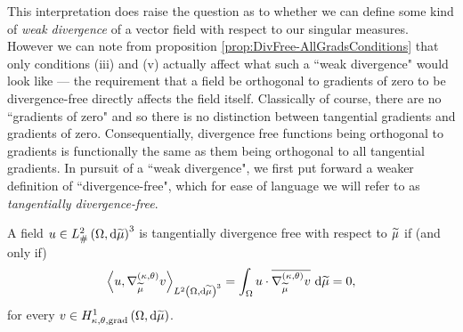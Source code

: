 This interpretation does raise the question as to whether we can define some kind of \emph{weak divergence} of a vector field with respect to our singular measures.
However we can note from proposition \ref{prop:DivFree-AllGradsConditions} that only conditions (iii) and (v) actually affect what such a ``weak divergence" would look like --- the requirement that a field be orthogonal to gradients of zero to be divergence-free directly affects the field itself.
Classically of course, there are no ``gradients of zero" and so there is no distinction between tangential gradients and gradients of zero.
Consequentially, divergence free functions being orthogonal to gradients is functionally the same as them being orthogonal to all tangential gradients.
In pursuit of a ``weak divergence", we first put forward a weaker definition of ``divergence-free", which for ease of language we will refer to as \emph{tangentially divergence-free}.
\begin{definition} \label{def:DivFree-TangGradients}
	A field $u\in L^2_{\#}\left( \Omega,\mathrm{d} \widetilde{\mu} \right)^3$ is tangentially divergence free with respect to $\widetilde{\mu}$ if (and only if)
	\begin{align*}
		\left\langle u , \nabla^{\left( \kappa, \theta \right)}_{\widetilde{\mu}}v \right\rangle_{L^{2}\left( \Omega,\mathrm{d} \widetilde{\mu} \right)^3} = \int_{\Omega} u\cdot\overline{\nabla^{\left( \kappa, \theta \right)}_{\widetilde{\mu}}v}  \ \mathrm{d}\widetilde{\mu} = 0,
	\end{align*}
	for every $v\in H^1_{\kappa,\theta,\mathrm{grad}}\left( \Omega, \mathrm{d}\widetilde{\mu} \right)$.
\end{definition}

